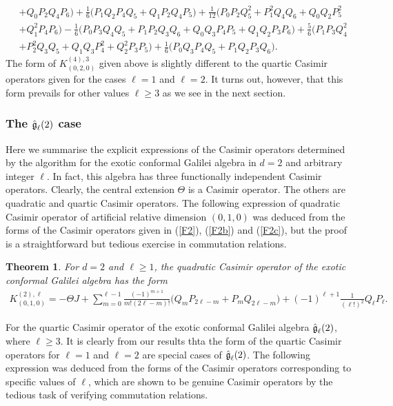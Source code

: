 \documentclass[12pt]{article}
\newtheorem{thm}{Theorem}
\begin{document}
\begin{align}
 \nonumber\\
& + Q_{0}P_{2} Q_{4} P_{6}\big)+\frac{1}{6} \big( P_{1} Q_{2}  P_{4} Q_{5}+ Q_{1}P_{2} Q_{4} P_{5}\big)    +  \frac{1}{12} \big( P_{0}  P_{2} Q^{2}_{5}+ P^{2}_{1} Q_{4} Q_{6}+ Q_{0} Q_{2}P^{2}_{5}
 \nonumber\\
 & + Q^{2}_{1}P_{4} P_{6}\big)-\frac{1}{6} \big(  P_{0}P_{3} Q_{4}Q_{5} + P_{1}P_{2} Q_{3}Q_{6}+Q_{0}Q_{3} P_{4}P_{5}   +  Q_{1}Q_{2} P_{3}P_{6}\big)+ \frac{5}{6} \big(  P_{1}P_{3} Q^{2}_{4} 
 \nonumber\\
 &+ P^{2}_{2} Q_{3}Q_{5}+Q_{1}Q_{3} P^{2}_{4}+ Q^{2}_{2} P_{3}P_{5}\big)+\frac{1}{6} \big(  P_{0}Q_{3} P_{4}Q_{5} + P_{1} Q_{2} P_{3}Q_{6}\big).
 \end{align}
The form of $K^{(4),3}_{(0,2,0)}$ given above is slightly different to the
quartic Casimir operators given for the cases $\ell=1$ and $\ell=2$. It turns
out, however, that this form prevails for other values $\ell\geq 3$ as we see
in the next section.

\subsubsection{The $\mathfrak{\Hat{g}}_{\ell}(2)$  case }

Here we summarise the explicit expressions of the Casimir operators determined
by the algorithm for the
exotic conformal Galilei algebra in $d=2$ and arbitrary integer $\ell$. In
fact, this algebra has three functionally independent Casimir operators.
Clearly, the central extension $\Theta$ is  a Casimir operator. The others are
quadratic and quartic Casimir operators. The following expression of quadratic
Casimir operator of artificial relative dimension $(0, 1,0)$ was deduced from the
forms of the Casimir operators given in (\ref{F2}), (\ref{F2b}) and (\ref{F2c}),
but the proof is a straightforward but tedious exercise in commutation
relations.

\begin{thm}
For $d=2$ and $\ell \geq1$, the quadratic Casimir operator of the exotic conformal Galilei algebra has the form
\begin{eqnarray}
K^{(2),\ell}_{(0,1,0)}= -\Theta J+ \sum\limits_{m=0}^{\ell- 1}\frac{(-1)^{m+1}}{m! (2\ell- m)!} \Bigg(Q_{m} P_{2\ell- m}+ P_{m}Q_{2\ell- m}\Bigg)+(-1)^{\ell+ 1} \frac{1}{(\ell !)^{2}}Q_{\ell}P_{\ell}. \label{r2a}
\end{eqnarray} 
\end{thm}

For the quartic Casimir operator of the exotic conformal Galilei algebra
$\mathfrak{\Hat{g}}_{\ell}(2)$, where $\ell \geq 3$. It is clearly from our results
thta the form of the quartic Casimir operators for $\ell=1$ and $\ell=2$ are
special cases of $\mathfrak{\Hat{g}}_{\ell}(2)$. The following expression was
deduced from the forms of the Casimir operators corresponding to specific
values of $\ell$, which are shown to be
genuine Casimir operators by the tedious task of verifying commutation relations. 
\end{document}
